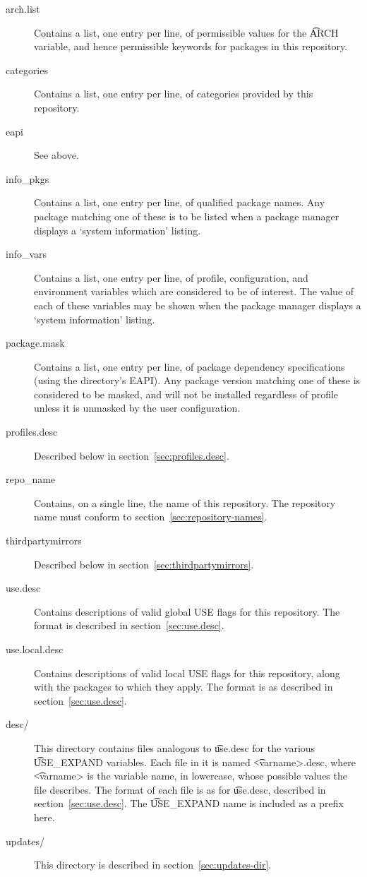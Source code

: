 \begin{description}
\item[arch.list] \label{arch.list} Contains a list, one entry per line, of permissible values for
    the \t{ARCH} variable, and hence permissible keywords for packages in this repository.
\item[categories] \label{profiles-categories} Contains a list, one entry per line, of categories
    provided by this repository.
\item[eapi] See above.
\item[info\_pkgs] Contains a list, one entry per line, of qualified package names. Any package
    matching one of these is to be listed when a package manager displays a `system information'
    listing.
\item[info\_vars] Contains a list, one entry per line, of profile, configuration, and environment
    variables which are considered to be of interest. The value of each of these variables may be
    shown when the package manager displays a `system information' listing.
\item[package.mask] \label{profiles-package.mask}
    Contains a list, one entry per line, of package dependency specifications (using the directory's
    EAPI). Any package version matching one of these is considered to be masked, and will not be
    installed regardless of profile unless it is unmasked by the user configuration.
\item[profiles.desc] Described below in section~\ref{sec:profiles.desc}.
\item[repo\_name] Contains, on a single line, the name of this repository. The repository name must
    conform to section~\ref{sec:repository-names}.
\item[thirdpartymirrors] Described below in section~\ref{sec:thirdpartymirrors}.
\item[use.desc] Contains descriptions of valid global USE flags for this repository. The format is
    described in section~\ref{sec:use.desc}.
\item[use.local.desc] Contains descriptions of valid local USE flags for this repository, along with
    the packages to which they apply. The format is as described in section~\ref{sec:use.desc}.
\item[desc/] This directory contains files analogous to \t{use.desc} for the various \t{USE\_EXPAND}
    variables. Each file in it is named \t{<varname>.desc}, where \t{<varname>} is the variable
    name, in lowercase, whose possible values the file describes. The format of each file is as for
    \t{use.desc}, described in section~\ref{sec:use.desc}. The \t{USE\_EXPAND} name is 
    included as a prefix here.
\item[updates/] This directory is described in section~\ref{sec:updates-dir}.
\end{description}

